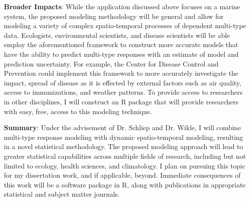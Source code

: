 \documentclass[12pt]{article}
\begin{document}
\vspace{2mm}

\noindent \textbf{Broader Impacts}: While the application discussed above focuses on a marine system, the proposed modeling methodology will be general and allow for modeling a variety of complex spatio-temporal processes of dependent multi-type data. Ecologists, environmental scientists, and disease scientists will be able employ the aforementioned framework to construct more accurate models that have the ability to predict multi-type responses with an estimate of model and prediction uncertainty. For example, the Center for Disease Control and Prevention could implement this framework to more accurately investigate the impact, spread of disease as it is effected by external factors such as air quality, access to immunizations, and weather patterns. To provide access to researchers in other disciplines, I will construct an R package that will provide researchers with easy, free, access to this modeling technique.


\vspace{2mm}

\noindent \textbf{Summary}: Under the advisement of Dr. Schliep and Dr. Wikle, I will combine multi-type response modeling with dynamic spatio-temporal modeling, resulting in a novel statistical methodology. The proposed modeling approach will lead to greater statistical capabilities across multiple fields of research, including but not limited to ecology, health sciences, and climatology. I plan on pursuing this topic for my dissertation work, and if applicable, beyond. Immediate consequences of this work will be a software package in R, along with publications in appropriate statistical and subject matter journals.


{\footnotesize }
\end{document}
